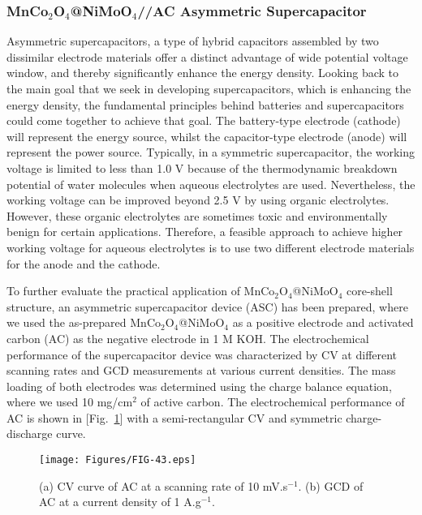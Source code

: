 \documentclass[reprint,amsmath,amssymb,aps,floatfix,
]{revtex4-2}
\begin{document}
\subsubsection{MnCo$_2$O$_4$@NiMoO$_4$//AC Asymmetric Supercapacitor}
Asymmetric supercapacitors, a type of hybrid capacitors assembled by two dissimilar electrode materials offer a distinct advantage of wide potential voltage window, and thereby significantly enhance the energy density. Looking back to the main goal that we seek in developing supercapacitors, which is enhancing the energy density, the fundamental principles behind batteries and supercapacitors could come together to achieve that goal. The battery-type electrode (cathode) will represent the energy source, whilst the capacitor-type electrode (anode) will represent the power source. Typically, in a symmetric supercapacitor, the working voltage is limited to less than 1.0 V because of the thermodynamic breakdown potential of water molecules when aqueous electrolytes are used. Nevertheless, the working voltage can be improved beyond 2.5 V by using organic electrolytes. However, these organic electrolytes are sometimes toxic and environmentally benign for certain applications. Therefore, a feasible approach to achieve higher working voltage for aqueous electrolytes is to use two different electrode materials for the anode and the cathode.

To further evaluate the practical application of MnCo$_2$O$_4$@NiMoO$_4$ core-shell structure, an asymmetric supercapacitor device (ASC) has been prepared, where we used the as-prepared MnCo$_2$O$_4$@NiMoO$_4$ as a positive electrode and activated carbon (AC) as the negative electrode in 1 M KOH. The electrochemical performance of the supercapacitor device was characterized by CV at different scanning rates and GCD measurements at various current densities. The mass loading of both electrodes was determined using the charge balance equation, where we used 10 mg/cm$^2$ of active carbon. The electrochemical performance of AC is shown in [Fig.~\ref{fig:fig43}] with a semi-rectangular CV and symmetric charge-discharge curve.
\begin{figure}[b]
    \centering
    \texttt{[image: Figures/FIG-43.eps]}
    \caption{\label{fig:fig43}(a) CV curve of AC at a scanning rate of 10 mV.s$^{-1}$. (b) GCD of AC at a current density of 1 A.g$^{-1}$.}
    \end{figure}
\end{document}
